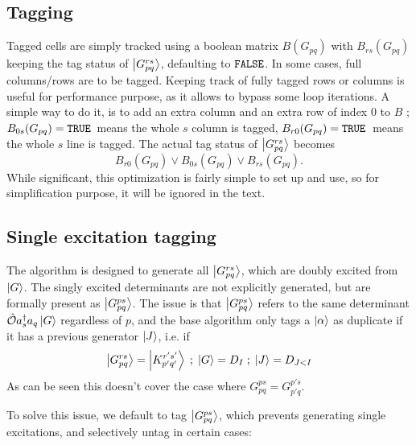 \documentclass[./thesis.tex]{subfiles}
\begin{document}
\subsection{Tagging}

Tagged cells are simply tracked using a boolean matrix $B(G_{pq})$ with $B_{rs}(G_{pq})$ keeping the tag status of $\ket{G^{rs}_{pq}}$, defaulting to ${\text{\texttt{FALSE}}}$.
In some cases, full columns/rows are to be tagged. Keeping track of fully tagged rows or columns is useful for performance purpose, as it allows to bypass some loop iterations. A simple way to do it, is to add an extra column and an extra row of index $0$ to $B$ ; $B_{0s}(G_{pq}) = {\text{\texttt{TRUE}}}\,$ means the whole $s$ column is tagged, $B_{r0}(G_{pq}) = {\text{\texttt{TRUE}}}\,$ means the whole $s$ line is tagged. The actual tag status of $\ket{G^{rs}_{pq}}$ becomes
\begin{equation}
B_{r0}(G_{pq}) \vee B_{0s}(G_{pq}) \vee B_{rs}(G_{pq}).
\end{equation}
While significant, this optimization is fairly simple to set up and use, so for simplification purpose, it will be ignored in the text.


\subsection{Single excitation tagging}
\label{single_tagging}
The algorithm is designed to generate all $\ket {G_{pq}^{rs}}$, which are doubly excited from $\ket G$. The singly excited determinants are not explicitly generated, but are formally present as $\ket{G_{pq}^{ps}}$.
The issue is that $\ket{G_{pq}^{ps}}$ refers to the same determinant ${\hat{\mathcal{O}}} a^\dagger_s a_q \ket{G}$ regardless of $p$, and the base algorithm only tags a ${\ket{\alpha}}$ as duplicate if it has a previous generator $\ket J$, i.e. if
\begin{equation}
\ket {G_{pq}^{rs}} = \ket {K_{p'q'}^{r's'}} \; ; \; \ket G = D_I \; ; \; \ket J = D_{J<I}
\end{equation}
As can be seen this doesn't cover the case where $G_{pq}^{ps} = G_{p'q}^{p's}$.

To solve this issue, we default to tag $\ket {G_{pq}^{ps}}$, which prevents generating single excitations, and selectively untag in certain cases:
\end{document}
